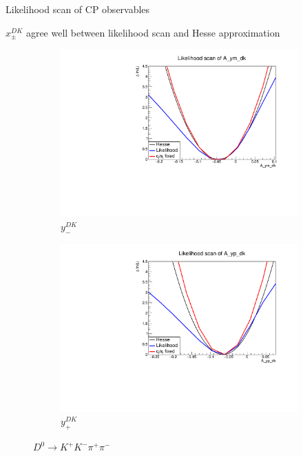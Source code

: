 \documentclass[xcolor={dvipsnames}]{beamer}
\begin{document}
\begin{frame}{Likelihood scan of CP observables}
  \begin{center}
    $x_\pm^{DK}$ agree well between likelihood scan and Hesse approximation
  \end{center}
  \begin{figure}
    \centering
    \begin{subfigure}{0.5\textwidth}
      \centering
      \includegraphics[width=1.0\textwidth]{Plots/A_ym_dk_likelihood_scan_KKpipi.pdf}
      \vspace{-0.3cm}
      \caption*{$y_-^{DK}$}
    \end{subfigure}%
    \begin{subfigure}{0.5\textwidth}
      \centering
      \includegraphics[width=1.0\textwidth]{Plots/A_yp_dk_likelihood_scan_KKpipi.pdf}
      \vspace{-0.3cm}
      \caption*{$y_+^{DK}$}
    \end{subfigure}
    \caption*{$D^0\to K^+K^-\pi^+\pi^-$}
  \end{figure}
\end{frame}
\end{document}
